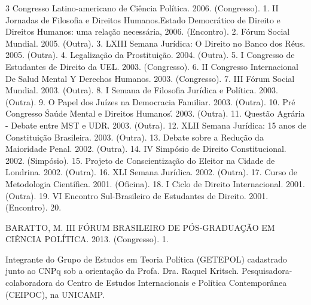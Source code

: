 

\begin{cvhonors}
  \cvhonor
    {}{3 Congresso Latino-americano de Ciência Política. 2006. (Congresso).}
    {}
    {1.}
  \cvhonor
    {}{II Jornadas de Filosofia e Direitos Humanos.Estado Democrático de Direito e Direitos Humanos: uma relação necessária, 2006. (Encontro).}
    {}
    {2.}
  \cvhonor
    {}{Fórum Social Mundial. 2005. (Outra).}
    {}
    {3.}
  \cvhonor
    {}{LXIII Semana Jurídica: O Direito no Banco dos Réus. 2005. (Outra).}
    {}
    {4.}
  \cvhonor
    {}{Legalização da Prostituição. 2004. (Outra).}
    {}
    {5.}
  \cvhonor
    {}{I Congresso de Estudantes de Direito da UEL. 2003. (Congresso).}
    {}
    {6.}
  \cvhonor
    {}{II Congresso Internacional De Salud Mental Y Derechos Humanos. 2003. (Congresso).}
    {}
    {7.}
  \cvhonor
    {}{III Fórum Social Mundial. 2003. (Outra).}
    {}
    {8.}
  \cvhonor
    {}{I Semana de Filosofia Jurídica e Política. 2003. (Outra).}
    {}
    {9.}
  \cvhonor
    {}{O Papel dos Juízes na Democracia Familiar. 2003. (Outra).}
    {}
    {10.}
  \cvhonor
    {}{Pré Congresso \'Saúde Mental e Direitos Humanos\'. 2003. (Outra).}
    {}
    {11.}
  \cvhonor
    {}{Questão Agrária - Debate entre MST e UDR. 2003. (Outra).}
    {}
    {12.}
  \cvhonor
    {}{XLII Semana Jurídica: 15 anos de Constituição Brasileira. 2003. (Outra).}
    {}
    {13.}
  \cvhonor
    {}{Debate sobre a Redução da Maioridade Penal. 2002. (Outra).}
    {}
    {14.}
  \cvhonor
    {}{IV Simpósio de Direito Constitucional. 2002. (Simpósio).}
    {}
    {15.}
  \cvhonor
    {}{Projeto de Conscientização do Eleitor na Cidade de Londrina. 2002. (Outra).}
    {}
    {16.}
  \cvhonor
    {}{XLI Semana Jurídica. 2002. (Outra).}
    {}
    {17.}
  \cvhonor
    {}{Curso de Metodologia Científica. 2001. (Oficina).}
    {}
    {18.}
  \cvhonor
    {}{I Ciclo de Direito Internacional. 2001. (Outra).}
    {}
    {19.}
  \cvhonor
    {}{VI Encontro Sul-Brasileiro de Estudantes de Direito. 2001. (Encontro).}
    {}
    {20.}
\end{cvhonors}


\begin{cvhonors}
  \cvhonor
    {BARATTO, M.}
    {III FÓRUM BRASILEIRO DE PÓS-GRADUAÇÃO EM CIÊNCIA POLÍTICA. 2013. (Congresso).}
    {}
    {1. }
\end{cvhonors}


\begin{cvhonors}
  \cvhonor
    {Integrante do Grupo de Estudos em Teoria Política (GETEPOL)}
    {cadastrado junto ao CNPq sob a orientação da Profa. Dra. Raquel Kritsch. Pesquisadora-colaboradora do Centro de Estudos Internacionais e Política Contemporânea (CEIPOC), na UNICAMP.}
    {}
    {}
\end{cvhonors}
